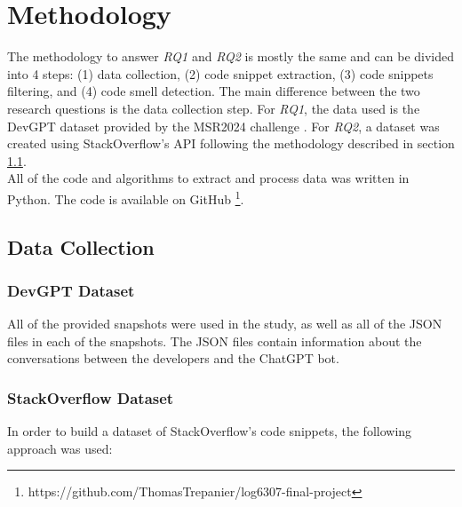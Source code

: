 
\section{Methodology}
\label{sec:methodology}
The methodology to answer \textit{RQ1} and \textit{RQ2} is mostly the same and can be divided into 4 steps: (1) data collection, (2) code snippet extraction, (3) code snippets filtering, and (4) code smell detection. The main difference between the two research questions is the data collection step. For \textit{RQ1}, the data used is the DevGPT dataset provided by the MSR2024 challenge \cite{devgpt}. For \textit{RQ2}, a dataset was created using StackOverflow's API following the methodology described in section \ref{sec:data-collection}. \\

All of the code and algorithms to extract and process data was written in Python. The code is available on GitHub \footnote{https://github.com/ThomasTrepanier/log6307-final-project}.

\subsection{Data Collection}
\label{sec:data-collection}
\subsubsection{DevGPT Dataset}
All of the provided snapshots were used in the study, as well as all of the JSON files in each of the snapshots. The JSON files contain information about the conversations between the developers and the ChatGPT bot. \\

\subsubsection{StackOverflow Dataset}
In order to build a dataset of StackOverflow's code snippets, the following approach was used: \\

